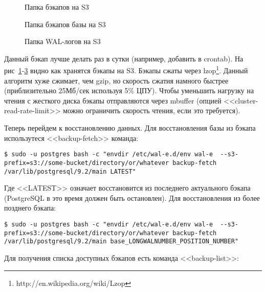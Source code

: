 \begin{figure}[h!]
  \caption{Папка бэкапов на S3}
  \label{fig:wal-e1}
\end{figure}

\begin{figure}[h!]
  \caption{Папка бэкапов базы на S3}
  \label{fig:wal-e2}
\end{figure}

\begin{figure}[h!]
  \caption{Папка WAL-логов на S3}
  \label{fig:wal-e3}
\end{figure}

Данный бэкап лучше делать раз в сутки (например, добавить в crontab). На рис~\ref{fig:wal-e1}-\ref{fig:wal-e3} видно как хранятся бэкапы на S3. Бэкапы сжаты через lzop\footnote{http://en.wikipedia.org/wiki/Lzop}. Данный алгоритм хуже сжимает, чем gzip, но скорость сжатия намного быстрее (приблизительно 25Мб/сек используя 5\% ЦПУ). Чтобы уменьшить нагрузку на чтения с жесткого диска бэкапы отправляются через mbuffer (опцией <<cluster-read-rate-limit>> можно ограничить скорость чтения, если это требуется).

Теперь перейдем к восстановлению данных. Для восстановления базы из бэкапа использутеся <<backup-fetch>> команда:

\begin{lstlisting}[label=lst:wal-e10,caption=Восстановление бэкапа базы из S3]
$ sudo -u postgres bash -c "envdir /etc/wal-e.d/env wal-e  --s3-prefix=s3://some-bucket/directory/or/whatever backup-fetch /var/lib/postgresql/9.2/main LATEST"
\end{lstlisting}

Где <<LATEST>> означает восстановится из последнего актуального бэкапа (PostgreSQL в это время должен быть остановлен). Для восстановления из более позднего бэкапа:

\begin{lstlisting}[label=lst:wal-e11,caption=Восстановление старшего бэкапа из S3]
$ sudo -u postgres bash -c "envdir /etc/wal-e.d/env wal-e  --s3-prefix=s3://some-bucket/directory/or/whatever backup-fetch /var/lib/postgresql/9.2/main base_LONGWALNUMBER_POSITION_NUMBER"
\end{lstlisting}

Для получения списка доступных бэкапов есть команда <<backup-list>>:


